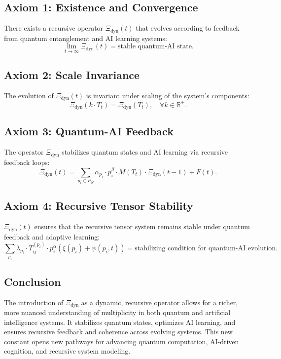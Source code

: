 \documentclass[12pt]{article}
\begin{document}
\subsection{Axiom 1: Existence and Convergence}
There exists a recursive operator $\Xi_{\text{dyn}}(t)$ that evolves according to feedback from quantum entanglement and AI learning systems:
\[
\lim_{t \to \infty} \Xi_{\text{dyn}}(t) = \text{stable quantum-AI state}.
\]

\subsection{Axiom 2: Scale Invariance}
The evolution of $\Xi_{\text{dyn}}(t)$ is invariant under scaling of the system's components:
\[
\Xi_{\text{dyn}}(k \cdot T_t) = \Xi_{\text{dyn}}(T_t), \quad \forall k \in \mathbb{R}^+.
\]

\subsection{Axiom 3: Quantum-AI Feedback}
The operator $\Xi_{\text{dyn}}$ stabilizes quantum states and AI learning via recursive feedback loops:
\[
\Xi_{\text{dyn}}(t) = \sum_{p_i \in P_N} \alpha_{p_i} \cdot p_i^{\beta} \cdot M(T_t) \cdot \Xi_{\text{dyn}}(t-1) + F(t).
\]

\subsection{Axiom 4: Recursive Tensor Stability}
$\Xi_{\text{dyn}}(t)$ ensures that the recursive tensor system remains stable under quantum feedback and adaptive learning:
\[
\sum_{p_i} \lambda_{p_i} \cdot T_{ij}^{(p_i)} \cdot p_i^{\alpha} \left( \xi(p_i) + \psi(p_i, t) \right) = \text{stabilizing condition for quantum-AI evolution}.
\]

\subsection{Conclusion}
The introduction of $\Xi_{\text{dyn}}$ as a dynamic, recursive operator allows for a richer, more nuanced understanding of multiplicity in both quantum and artificial intelligence systems. It stabilizes quantum states, optimizes AI learning, and ensures recursive feedback and coherence across evolving systems. This new constant opens new pathways for advancing quantum computation, AI-driven cognition, and recursive system modeling.
\end{document}
